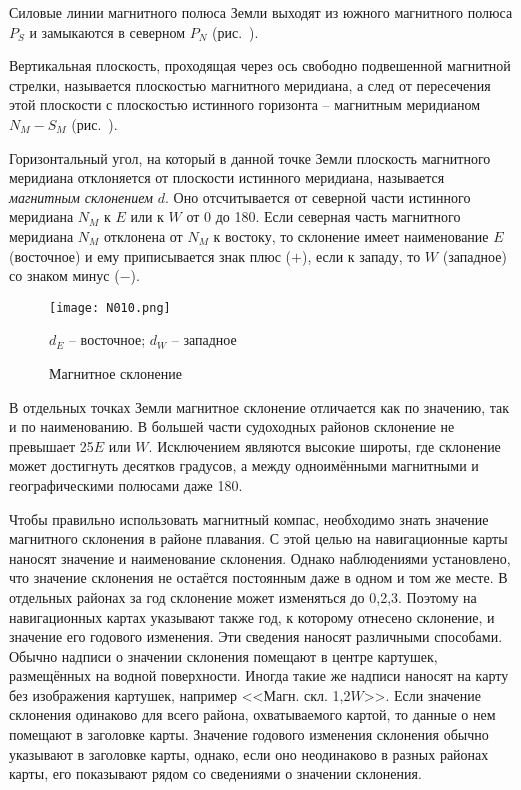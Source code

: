 Силовые линии магнитного полюса Земли выходят из южного магнитного
полюса $P_S$ и замыкаются в северном $P_N$ (рис.~).

Вертикальная плоскость, проходящая через ось свободно подвешенной
магнитной стрелки, называется плоскостью магнитного меридиана, а след
от пересечения этой плоскости с плоскостью истинного горизонта \---
магнитным меридианом $N_M - S_M$ (рис.~).

Горизонтальный угол, на который в данной точке Земли плоскость
магнитного меридиана отклоняется от плоскости истинного меридиана,
называется \textit{магнитным склонением}
$d$. Оно отсчитывается от северной части истинного меридиана $N_M$ к
$E$ или к $W$ от 0 до 180\gr. Если северная часть магнитного меридиана
$N_M$ отклонена от $N_M$ к востоку, то склонение имеет наименование
$E$ (восточное) и ему приписывается знак плюс ($+$), если к западу, то
$W$ (западное) со знаком минус ($-$).

\begin{wrapfigure}{O}{0.4\textwidth}
  \centering{}
  \texttt{[image: N010.png]}
  \caption{Магнитное склонение}
  \label{fig:N10}
  \small
  \centering{}
  $d_E$ \--- восточное; $d_W$ \--- западное
\end{wrapfigure}

В отдельных точках Земли магнитное склонение отличается как по
значению, так и по наименованию. В большей части судоходных районов
склонение не превышает 25\gr $E$ или $W$. Исключением являются высокие
широты, где склонение может достигнуть десятков градусов, а между
одноимёнными магнитными и географическими полюсами даже 180\gr.

Чтобы правильно использовать магнитный компас, необходимо знать
значение магнитного склонения в районе плавания. С этой целью на
навигационные карты наносят значение и наименование склонения. Однако
наблюдениями установлено, что значение склонения не остаётся
постоянным даже в одном и том же месте. В отдельных районах за год
склонение может изменяться до 0,2,3\gr. Поэтому на
навигационных картах указывают также год, к которому отнесено
склонение, и значение его годового изменения. Эти сведения наносят
различными способами. Обычно надписи о значении склонения помещают в
центре картушек, размещённых на водной поверхности. Иногда такие же
надписи наносят на карту без изображения картушек, например
<<Магн. скл. 1,2\gr $W$>>. Если значение склонения одинаково для всего
района, охватываемого картой, то данные о нем помещают в заголовке
карты. Значение годового изменения склонения обычно указывают в
заголовке карты, однако, если оно неодинаково в разных районах карты,
его показывают рядом со сведениями о значении склонения.

